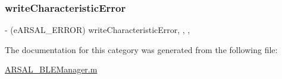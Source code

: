 \subsubsection{\texorpdfstring{write\+Characteristic\+Error}{writeCharacteristicError}}
{\footnotesize\ttfamily -\/ (e\+A\+R\+S\+A\+L\+\_\+\+E\+R\+R\+OR) write\+Characteristic\+Error\hspace{0.3cm}{\ttfamily [read]}, {\ttfamily [write]}, {\ttfamily [nonatomic]}, {\ttfamily [assign]}}



The documentation for this category was generated from the following file\+:\begin{DoxyCompactItemize}
\item 
\hyperlink{ARSAL__BLEManager_8m}{A\+R\+S\+A\+L\+\_\+\+B\+L\+E\+Manager.\+m}\end{DoxyCompactItemize}

